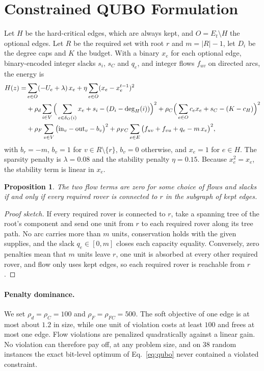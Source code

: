 \documentclass[11pt]{article}
\newtheorem{proposition}{Proposition}
\begin{document}
\section{Constrained QUBO Formulation}
\label{sec:qubo}

Let $H$ be the hard-critical edges, which are always kept, and
$O=E_t\setminus H$ the optional edges. Let $R$ be the required set with root
$r$ and $m=|R|-1$, let $D_i$ be the degree caps and $K$ the budget. With a
binary $x_e$ for each optional edge, binary-encoded integer slacks $s_i$,
$s_C$ and $q_e$, and integer flows $f_{uv}$ on directed arcs, the energy is
\begin{align}
H(z) =& \sum_{e\in O}(-U_e+\lambda)\,x_e
+ \eta\sum_{e\in O}(x_e-x_e^{t-1})^2 \notag\\
&+ \rho_d\sum_{i\in V}\Big(\sum_{e\in\delta_O(i)} x_e + s_i - (D_i-\deg_H(i))\Big)^2
+ \rho_C\Big(\sum_{e\in O} c_e x_e + s_C - (K-c_H)\Big)^2 \notag\\
&+ \rho_F\sum_{v\in V}\big(\mathrm{in}_v-\mathrm{out}_v-b_v\big)^2
+ \rho_{FC}\sum_{e\in E}\big(f_{uv}+f_{vu}+q_e-m\,x_e\big)^2,
\label{eq:qubo}
\end{align}
with $b_r=-m$, $b_v=1$ for $v\in R\setminus\{r\}$, $b_v=0$ otherwise, and
$x_e=1$ for $e\in H$. The sparsity penalty is $\lambda=0.08$ and the stability
penalty $\eta=0.15$. Because $x_e^2=x_e$, the stability term is linear in
$x_e$.

\begin{proposition}
The two flow terms are zero for some choice of flows and slacks if and only
if every required rover is connected to $r$ in the subgraph of kept edges.
\end{proposition}

\begin{proof}[Proof sketch]
If every required rover is connected to $r$, take a spanning tree of the
root's component and send one unit from $r$ to each required rover along its
tree path. No arc carries more than $m$ units, conservation holds with the
given supplies, and the slack $q_e\in[0,m]$ closes each capacity equality.
Conversely, zero penalties mean that $m$ units leave $r$, one unit is absorbed
at every other required rover, and flow only uses kept edges, so each
required rover is reachable from $r$.
\end{proof}

\paragraph{Penalty dominance.}
We set $\rho_d=\rho_C=100$ and $\rho_F=\rho_{FC}=500$. The soft objective of
one edge is at most about $1.2$ in size, while one unit of violation costs at
least $100$ and frees at most one edge. Flow violations are penalized
quadratically against a linear gain. No violation can therefore pay off, at
any problem size, and on 38 random instances the exact bit-level optimum of
Eq.~\eqref{eq:qubo} never contained a violated constraint.
\end{document}
